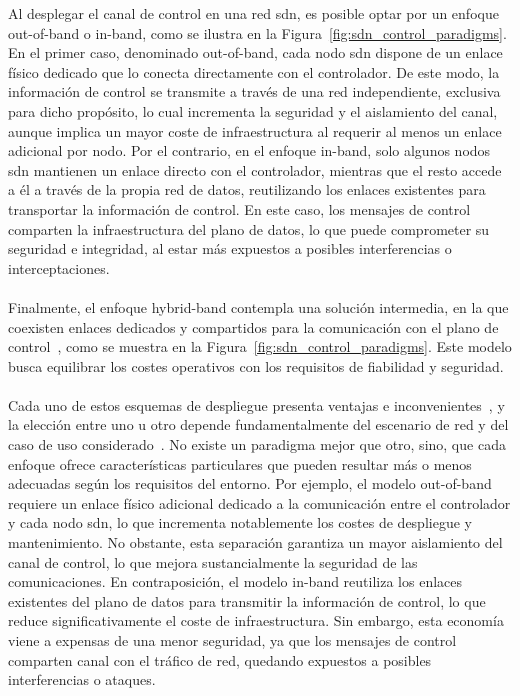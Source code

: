 Al desplegar el canal de control en una red \gls{sdn}, es posible optar por un enfoque out-of-band o in-band, como se ilustra en la Figura~\ref{fig:sdn_control_paradigms}. En el primer caso, denominado out-of-band, cada nodo \gls{sdn} dispone de un enlace físico dedicado que lo conecta directamente con el controlador. De este modo, la información de control se transmite a través de una red independiente, exclusiva para dicho propósito, lo cual incrementa la seguridad y el aislamiento del canal, aunque implica un mayor coste de infraestructura al requerir al menos un enlace adicional por nodo. Por el contrario, en el enfoque in-band, solo algunos nodos \gls{sdn} mantienen un enlace directo con el controlador, mientras que el resto accede a él a través de la propia red de datos, reutilizando los enlaces existentes para transportar la información de control. En este caso, los mensajes de control comparten la infraestructura del plano de datos, lo que puede comprometer su seguridad e integridad, al estar más expuestos a posibles interferencias o interceptaciones. \\
\\
Finalmente, el enfoque hybrid-band contempla una solución intermedia, en la que coexisten enlaces dedicados y compartidos para la comunicación con el plano de control~\cite{Suo16}, como se muestra en la Figura~\ref{fig:sdn_control_paradigms}. Este modelo busca equilibrar los costes operativos con los requisitos de fiabilidad y seguridad.\\
\\
Cada uno de estos esquemas de despliegue presenta ventajas e inconvenientes~\cite{Suo16}, y la elección entre uno u otro depende fundamentalmente del escenario de red y del caso de uso considerado~\cite{Jalili17,Kafetzis22}. No existe un paradigma mejor que otro, sino, que cada enfoque ofrece características particulares que pueden resultar más o menos adecuadas según los requisitos del entorno. Por ejemplo, el modelo out-of-band requiere un enlace físico adicional dedicado a la comunicación entre el controlador y cada nodo \gls{sdn}, lo que incrementa notablemente los costes de despliegue y mantenimiento. No obstante, esta separación garantiza un mayor aislamiento del canal de control, lo que mejora sustancialmente la seguridad de las comunicaciones. En contraposición, el modelo in-band reutiliza los enlaces existentes del plano de datos para transmitir la información de control, lo que reduce significativamente el coste de infraestructura. Sin embargo, esta economía viene a expensas de una menor seguridad, ya que los mensajes de control comparten canal con el tráfico de red, quedando expuestos a posibles interferencias o ataques. \\
